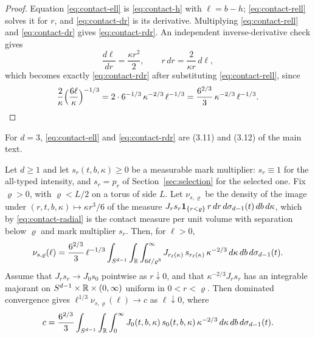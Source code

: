 \begin{proof}
Equation \eqref{eq:contact-ell} is \eqref{eq:contact-h} with $\ell=b-h$; \eqref{eq:contact-rell} solves it for $r$, and \eqref{eq:contact-dr} is its derivative. Multiplying \eqref{eq:contact-rell} and \eqref{eq:contact-dr} gives \eqref{eq:contact-rdr}. An independent inverse-derivative check gives
\begin{equation}\label{eq:contact-inverse}
\frac{d\ell}{dr}=\frac{\kappa r^2}2,\qquad r\,dr=\frac2{\kappa r}\,d\ell,
\end{equation}
which becomes exactly \eqref{eq:contact-rdr} after substituting \eqref{eq:contact-rell}, since
\[
\frac2{\kappa}\Bigl(\frac{6\ell}\kappa\Bigr)^{-1/3}=2\cdot6^{-1/3}\,\kappa^{-2/3}\,\ell^{-1/3}=\frac{6^{2/3}}3\,\kappa^{-2/3}\,\ell^{-1/3}.\qedhere
\]
\end{proof}

For $d=3$, \eqref{eq:contact-ell} and \eqref{eq:contact-rdr} are (3.11) and (3.12) of the main text.

\begin{proposition}\label{prop:contact-pushforward}
Let $d\ge1$ and let $s_r(t,b,\kappa)\ge0$ be a measurable mark multiplier: $s_r\equiv1$ for the all-typed intensity, and $s_r=p_r$ of Section~\ref{sec:selection} for the selected one. Fix $\varrho>0$, with $\varrho<L/2$ on a torus of side $L$. Let $\nu_{s,\varrho}$ be the density of the image under $(r,t,b,\kappa)\mapsto\kappa r^3/6$ of the measure $J_rs_r\mathbf 1_{\{r<\varrho\}}\,r\,dr\,d\sigma_{d-1}(t)\,db\,d\kappa$, which by \eqref{eq:contact-radial} is the contact measure per unit volume with separation below $\varrho$ and mark multiplier $s_r$. Then, for $\ell>0$,
\begin{equation}\label{eq:contact-nu-exact}
\nu_{s,\varrho}(\ell)=\frac{6^{2/3}}3\,\ell^{-1/3}\int_{S^{d-1}}\int_\mathbb R\int_{6\ell/\varrho^3}^\infty J_{r_\ell(\kappa)}\,s_{r_\ell(\kappa)}\,\kappa^{-2/3}\,d\kappa\,db\,d\sigma_{d-1}(t).
\end{equation}
Assume that $J_rs_r\to J_0s_0$ pointwise as $r\downarrow0$, and that $\kappa^{-2/3}J_rs_r$ has an integrable majorant on $S^{d-1}\times\mathbb R\times(0,\infty)$ uniform in $0<r<\varrho$. Then dominated convergence gives $\ell^{1/3}\nu_{s,\varrho}(\ell)\to c$ as $\ell\downarrow0$, where
\begin{equation}\label{eq:contact-c}
c=\frac{6^{2/3}}3\int_{S^{d-1}}\int_\mathbb R\int_0^\infty J_0(t,b,\kappa)\,s_0(t,b,\kappa)\,\kappa^{-2/3}\,d\kappa\,db\,d\sigma_{d-1}(t).
\end{equation}
\end{proposition}

